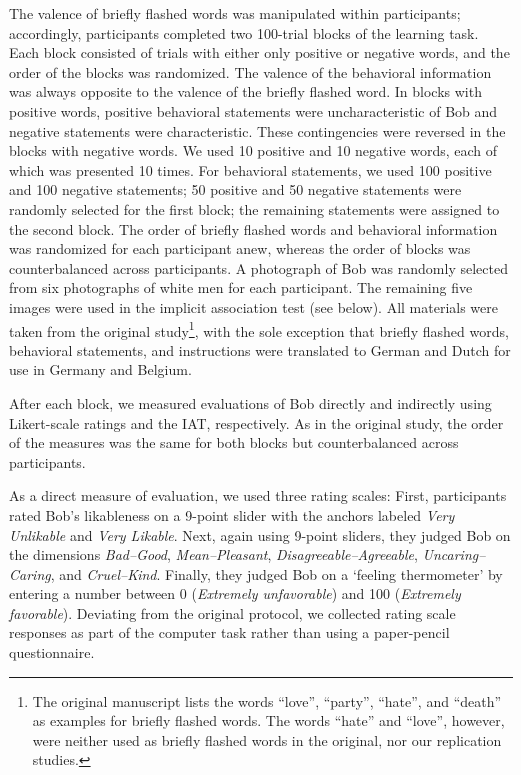 \documentclass[
  man,floatsintext]{apa6}
\begin{document}
The valence of briefly flashed words was manipulated within participants; accordingly, participants completed two 100-trial blocks of the learning task.
Each block consisted of trials with either only positive or negative words, and the order of the blocks was randomized.
The valence of the behavioral information was always opposite to the valence of the briefly flashed word.
In blocks with positive words, positive behavioral statements were uncharacteristic of Bob and negative statements were characteristic.
These contingencies were reversed in the blocks with negative words.
We used 10 positive and 10 negative words, each of which was presented 10 times.
For behavioral statements, we used 100 positive and 100 negative statements; 50 positive and 50 negative statements were randomly selected for the first block; the remaining statements were assigned to the second block.
The order of briefly flashed words and behavioral information was randomized for each participant anew, whereas the order of blocks was counterbalanced across participants.
A photograph of Bob was randomly selected from six photographs of white men for each participant.
The remaining five images were used in the implicit association test (see below).
All materials were taken from the original study\footnote{The original manuscript lists the words ``love'', ``party'', ``hate'', and ``death'' as examples for briefly flashed words. The words ``hate'' and ``love'', however, were neither used as briefly flashed words in the original, nor our replication studies.}, with the sole exception that briefly flashed words, behavioral statements, and instructions were translated to German and Dutch for use in Germany and Belgium.

After each block, we measured evaluations of Bob directly and indirectly using Likert-scale ratings and the IAT, respectively.
As in the original study, the order of the measures was the same for both blocks but counterbalanced across participants.

As a direct measure of evaluation, we used three rating scales:
First, participants rated Bob's likableness on a 9-point slider with the anchors labeled \emph{Very Unlikable} and \emph{Very Likable}.
Next, again using 9-point sliders, they judged Bob on the dimensions \emph{Bad--Good}, \emph{Mean--Pleasant}, \emph{Disagreeable--Agreeable}, \emph{Uncaring--Caring}, and \emph{Cruel--Kind}.
Finally, they judged Bob on a `feeling thermometer' by entering a number between 0 (\emph{Extremely unfavorable}) and 100 (\emph{Extremely favorable}).
Deviating from the original protocol, we collected rating scale responses as part of the computer task rather than using a paper-pencil questionnaire.
\end{document}
